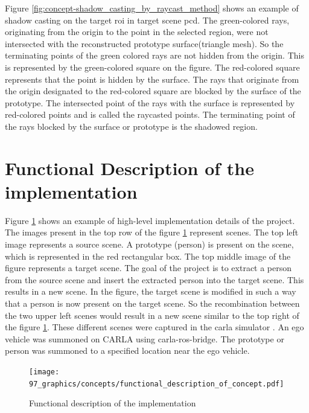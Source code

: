 Figure \ref{fig:concept-shadow_casting_by_raycast_method} shows an example of shadow casting on the target \acrshort{roi} in target scene \acrshort{pcd}. The green-colored rays, originating from the origin to the point in the selected region, were not intersected with the reconstructed prototype surface(triangle mesh). So the terminating points of the green colored rays are not hidden from the origin. This is represented by the green-colored square on the figure. The red-colored square represents that the point is hidden by the surface. The rays that originate from the origin designated to the red-colored square are blocked by the surface of the prototype. The intersected point of the rays with the surface is represented by red-colored points and is called the raycasted points. The terminating point of the rays blocked by the surface or prototype is the shadowed region.

\section{Functional Description of the implementation}

Figure \ref{fig:functional_description_of_concept} shows an example of high-level implementation details of the project. The images present in the top row of the figure \ref{fig:functional_description_of_concept} represent scenes. The top left image represents a source scene. A prototype (person) is present on the scene, which is represented in the red rectangular box. The top middle image of the figure represents a target scene. The goal of the project is to extract a person from the source scene and insert the extracted person into the target scene. This results in a new scene. In the figure, the target scene is modified in such a way that a person is now present on the target scene. So the recombination between the two upper left scenes would result in a new scene similar to the top right of the figure \ref{fig:functional_description_of_concept}.
These different scenes were captured in the \acrfull{carla} simulator \parencite{Dosovitskiy17}. An ego vehicle was summoned on CARLA using carla-ros-bridge. The prototype or person was summoned to a specified location near the ego vehicle.

\begin{figure}[htbp]
    \centering
    \texttt{[image: 97\_graphics/concepts/functional\_description\_of\_concept.pdf]}
    \caption{Functional description of the implementation}
    \label{fig:functional_description_of_concept}
\end{figure}

